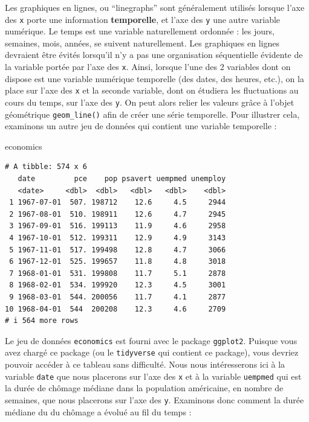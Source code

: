 \documentclass[
  a4paper,
  DIV=11,
  numbers=noendperiod,
  oneside]{scrreprt}
\newenvironment{Shaded}{}{}
\newcommand{\NormalTok}[1]{\textcolor[rgb]{0.14,0.16,0.18}{#1}}
\begin{document}
Les graphiques en lignes, ou ``linegraphs'' sont généralement utilisés
lorsque l'axe des \texttt{x} porte une information \textbf{temporelle},
et l'axe des \texttt{y} une autre variable numérique. Le temps est une
variable naturellement ordonnée : les jours, semaines, mois, années, se
suivent naturellement. Les graphiques en lignes devraient être évités
lorsqu'il n'y a pas une organisation séquentielle évidente de la
variable portée par l'axe des \texttt{x}. Ainsi, lorsque l'une des 2
variables dont on dispose est une variable numérique temporelle (des
dates, des heures, etc.), on la place sur l'axe des \texttt{x} et la
seconde variable, dont on étudiera les fluctuations au cours du temps,
sur l'axe des \texttt{y}. On peut alors relier les valeurs grâce à
l'objet géométrique \texttt{geom\_line()} afin de créer une série
temporelle. Pour illustrer cela, examinons un autre jeu de données qui
contient une variable temporelle :

\begin{Shaded}
\begin{Highlighting}[]
\NormalTok{economics}
\end{Highlighting}
\end{Shaded}

\begin{verbatim}
# A tibble: 574 x 6
   date         pce    pop psavert uempmed unemploy
   <date>     <dbl>  <dbl>   <dbl>   <dbl>    <dbl>
 1 1967-07-01  507. 198712    12.6     4.5     2944
 2 1967-08-01  510. 198911    12.6     4.7     2945
 3 1967-09-01  516. 199113    11.9     4.6     2958
 4 1967-10-01  512. 199311    12.9     4.9     3143
 5 1967-11-01  517. 199498    12.8     4.7     3066
 6 1967-12-01  525. 199657    11.8     4.8     3018
 7 1968-01-01  531. 199808    11.7     5.1     2878
 8 1968-02-01  534. 199920    12.3     4.5     3001
 9 1968-03-01  544. 200056    11.7     4.1     2877
10 1968-04-01  544  200208    12.3     4.6     2709
# i 564 more rows
\end{verbatim}

Le jeu de données \texttt{economics} est fourni avec le package
\texttt{ggplot2}. Puisque vous avez chargé ce package (ou le
\texttt{tidyverse} qui contient ce package), vous devriez pouvoir
accéder à ce tableau sans difficulté. Nous nous intéresserons ici à la
variable \texttt{date} que nous placerons sur l'axe des \texttt{x} et à
la variable \texttt{uempmed} qui est la durée de chômage médiane dans la
population américaine, en nombre de semaines, que nous placerons sur
l'axe des \texttt{y}. Examinons donc comment la durée médiane du du
chômage a évolué au fil du temps :
\end{document}
